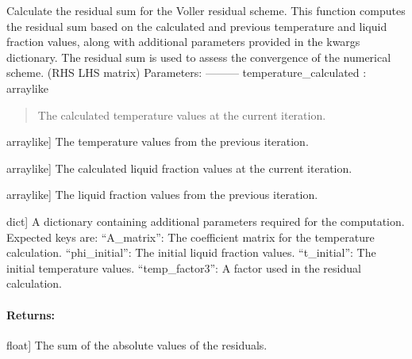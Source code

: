 \documentclass[a4paper,11pt,english,openany]{sphinxmanual}
\begin{document}
\begin{fulllineitems}
\label{\detokenize{api/spyice.statevariables:src.spyice.statevariables.voller_residual_scheme}}
\pysigstartsignatures
\pysiglinewithargsret
{}
{\sphinxparamcomma {}\sphinxparamcomma {}\sphinxparamcomma {}\sphinxparamcomma {}}
{}
\pysigstopsignatures
\sphinxAtStartPar
Calculate the residual sum for the Voller residual scheme.
This function computes the residual sum based on the calculated and previous
temperature and liquid fraction values, along with additional parameters
provided in the kwargs dictionary. The residual sum is used to assess the
convergence of the numerical scheme. (RHS \sphinxhyphen{} LHS matrix)
Parameters:
———\textendash{}
temperature\_calculated : array\sphinxhyphen{}like
\begin{quote}

\sphinxAtStartPar
The calculated temperature values at the current iteration.
\end{quote}
\begin{description}
\sphinxlineitem{temperature\_previous}{[}array\sphinxhyphen{}like{]}
\sphinxAtStartPar
The temperature values from the previous iteration.

\sphinxlineitem{liquid\_fraction\_calculated}{[}array\sphinxhyphen{}like{]}
\sphinxAtStartPar
The calculated liquid fraction values at the current iteration.

\sphinxlineitem{liquid\_fraction\_previous}{[}array\sphinxhyphen{}like{]}
\sphinxAtStartPar
The liquid fraction values from the previous iteration.

\sphinxlineitem{kwargs}{[}dict{]}
\sphinxAtStartPar
A dictionary containing additional parameters required for the computation.
Expected keys are:
\sphinxhyphen{} “A\_matrix”: The coefficient matrix for the temperature calculation.
\sphinxhyphen{} “phi\_initial”: The initial liquid fraction values.
\sphinxhyphen{} “t\_initial”: The initial temperature values.
\sphinxhyphen{} “temp\_factor3”: A factor used in the residual calculation.

\end{description}


\paragraph{Returns:}
\label{\detokenize{api/spyice.statevariables:returns}}\begin{description}
\sphinxlineitem{residual\_sum}{[}float{]}
\sphinxAtStartPar
The sum of the absolute values of the residuals.

\end{description}

\end{fulllineitems}
\end{document}

